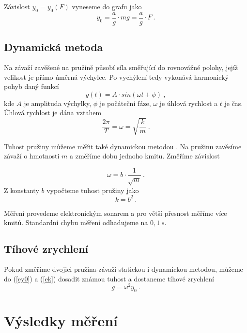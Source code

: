 \documentclass{article}
\begin{document}
Závislost $y_{0}=y_{0}(F)$ vyneseme do grafu jako
\begin{equation} \label{eyF}
y_{0}=\frac{a}{g} \cdot mg=\frac{a}{g} \cdot F~.
\end{equation}



\subsection*{Dynamická metoda}

Na závaží zavěšené na pružině působí síla směřující do rovnovážné polohy, jejíž velikost je přímo úměrná výchylce. Po vychýlení tedy vykonává harmonický pohyb daný funkcí
\begin{equation*}
y(t)=A \cdot sin(\omega t+ \phi)~,
\end{equation*}
kde $A$ je amplituda výchylky, $\phi$ je počáteční fáze, $\omega$ je úhlová rychlost a $t$ je čas. Úhlová rychlost je dána vztahem
\begin{equation} \label{eome}
\frac{2\pi}{T}= \omega = \sqrt{\frac{k}{m}}~.
\end{equation}


Tuhost pružiny můžeme měřit také dynamickou metodou \cite{ZFP}. Na pružinu zavěsíme závaží o hmotnosti $m$ a změříme dobu jednoho kmitu. Změříme závislost

\begin{equation}
\omega = b \cdot \frac{1}{\sqrt{m}}~.
\end{equation}
Z konstanty $b$ vypočteme tuhost pružiny jako
\begin{equation} \label{ekb}
k=b^{2}~.
\end{equation}


Měření provedeme elektronickým sonarem a pro větší přesnost měříme více kmitů. Standardní chybu měření odhadujeme na $0,1~s$.

\subsection*{Tíhové zrychlení}

Pokud změříme dvojici pružina-závaží statickou i dynamickou metodou, můžeme do (\ref{ey0}) a (\ref{ek}) dosadit známou tuhost a dostaneme tíhové zrychlení
\begin{equation} \label{etiha}
g=\omega ^{2}y_{0}~.
\end{equation}

\section*{Výsledky měření}
\end{document}
